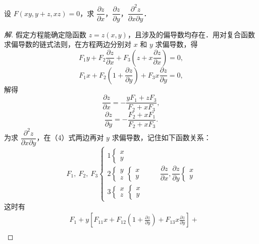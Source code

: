 \begin{example}\label{ex:16-2-7}
设 $F(xy,y+z,xz)=0$，求 $\dfrac{\partial z}{\partial x}$，$\dfrac{\partial z}{\partial y}$，$\dfrac{\partial^{2}z}{\partial x\partial y}$．
\end{example}

\begin{proof}[解]
假定方程能确定隐函数 $z=z(x,y)$，且涉及的偏导数均存在．用对复合函数求偏导数的链式法则，在方程两边分别对 $x$ 和 $y$ 求偏导数，得
\begin{equation}
F_{1}y+F_{2}\frac{\partial z}{\partial x}+F_{3}\left(z+x\frac{\partial z}{\partial x}\right)=0,
\tag{4}
\end{equation}
\begin{equation}
F_{1}x+F_{2}\left(1+\frac{\partial z}{\partial y}\right)+F_{3}x\frac{\partial z}{\partial y}=0,
\tag{5}
\end{equation}
解得
\[
\frac{\partial z}{\partial x}=-\frac{yF_{1}+zF_{3}}{F_{2}+xF_{3}},
\]
\[
\frac{\partial z}{\partial y}=-\frac{F_{2}+xF_{1}}{F_{2}+xF_{3}}.
\]
为求 $\dfrac{\partial^{2}z}{\partial x\partial y}$，在（4）式两边再对 $y$ 求偏导数，记住如下函数关系：
\[
F_{1},\ F_{2},\ F_{3}\left\{\begin{array}{l}1\left\{\begin{array}{l}x\\ y\end{array}\right.\\[4pt] 2\left\{\begin{array}{l}y\\ z\end{array}\right.\left\{\begin{array}{l}x\\ y\end{array}\right.\\[4pt] 3\left\{\begin{array}{l}x\\ z\end{array}\right.\left\{\begin{array}{l}x\\ y\end{array}\right.\end{array}\right.\qquad \frac{\partial z}{\partial x},\frac{\partial z}{\partial y}\left\{\begin{array}{l}x\\ y\end{array}\right.
\]
这时有
\[
\begin{aligned}
&F_{1}+y\left[F_{11}x+F_{12}\left(1+\frac{\partial z}{\partial y}\right)+F_{13}x\frac{\partial z}{\partial y}\right]+\\

\end{aligned}\]
\end{proof}
